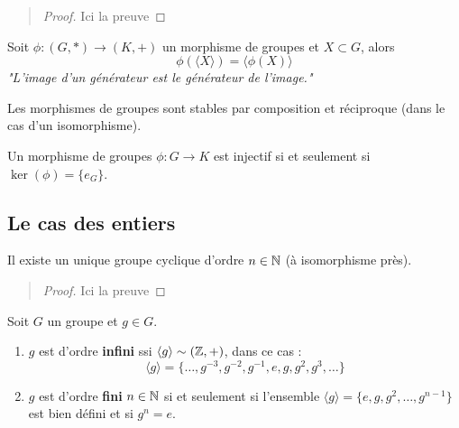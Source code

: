 \begin{quote}
	\footnotesize
	\begin{proof}
		Ici la preuve
    \end{proof}
	\normalsize
\end{quote}

\begin{corollary}
    Soit $\phi : (G,*) \longrightarrow (K,+)$ un morphisme de groupes et $X \subset G$, alors 
        \[ \boxed{ \phi(\langle  X \rangle ) =  \langle \phi(X) \rangle } \] 
    \emph{"L'image d'un générateur est le générateur de l'image."}
\end{corollary}

\begin{prop}
    Les morphismes de groupes sont stables par composition et réciproque (dans le cas d'un isomorphisme).
\end{prop}

\begin{lemma}
    Un morphisme de groupes $\phi : G \longrightarrow K$ est injectif si et seulement si $\ker(\phi) = \{e_{G}\}$.
\end{lemma}

\subsection{Le cas des entiers}

\begin{proposition}
    Il existe un unique groupe cyclique d'ordre $n \in \mathbb{N}$  (à isomorphisme près). 
\end{proposition}

\begin{quote}
	\footnotesize
	\begin{proof}
		Ici la preuve
    \end{proof}
	\normalsize
\end{quote}

\begin{theorem}
    Soit $G$ un groupe et $g \in G$. 
    \begin{enumerate}
        \item $g$ est d'ordre \textbf{infini} ssi $\langle g \rangle \sim (\mathbb{Z},+)$, dans ce cas :
            \[ \langle g \rangle = \{\dots, g^{-3}, g^{-2}, g^{-1}, e, g, g^2, g^3, \dots \} \] 
        \item $g$ est d'ordre \textbf{fini} $n \in \mathbb{N}$ si et seulement si l'ensemble $\langle g \rangle = \{e, g, g^2, \dots, g^{n-1}\}$ 
        est bien défini et si $g^n = e$.
    \end{enumerate}
\end{theorem}

